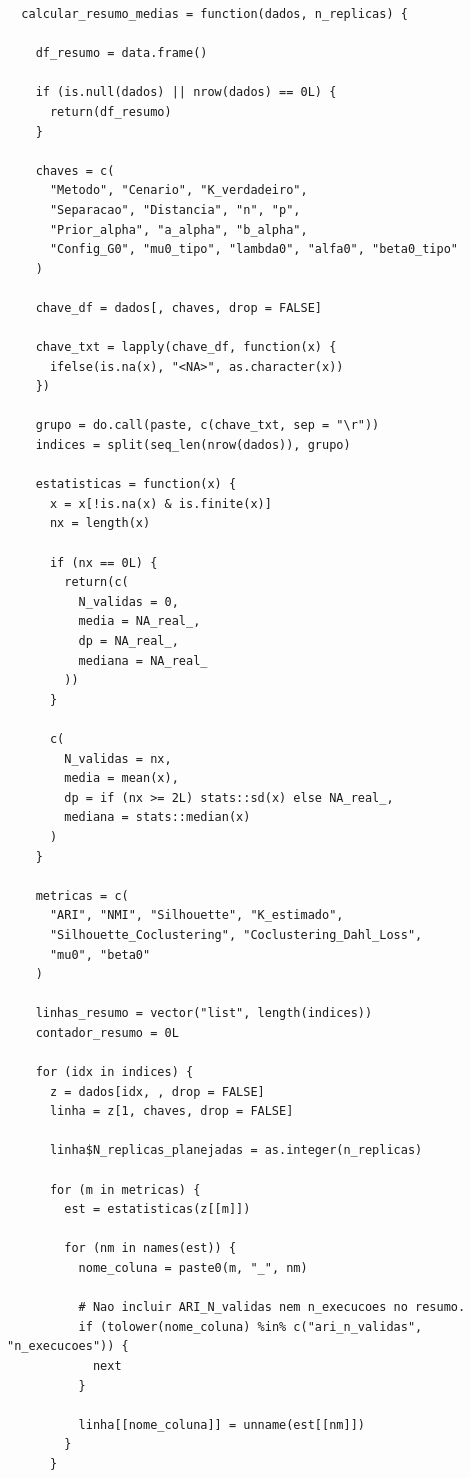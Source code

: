 \begin{verbatim}
  calcular_resumo_medias = function(dados, n_replicas) {
    
    df_resumo = data.frame()
    
    if (is.null(dados) || nrow(dados) == 0L) {
      return(df_resumo)
    }
    
    chaves = c(
      "Metodo", "Cenario", "K_verdadeiro",
      "Separacao", "Distancia", "n", "p",
      "Prior_alpha", "a_alpha", "b_alpha",
      "Config_G0", "mu0_tipo", "lambda0", "alfa0", "beta0_tipo"
    )
    
    chave_df = dados[, chaves, drop = FALSE]
    
    chave_txt = lapply(chave_df, function(x) {
      ifelse(is.na(x), "<NA>", as.character(x))
    })
    
    grupo = do.call(paste, c(chave_txt, sep = "\r"))
    indices = split(seq_len(nrow(dados)), grupo)
    
    estatisticas = function(x) {
      x = x[!is.na(x) & is.finite(x)]
      nx = length(x)
      
      if (nx == 0L) {
        return(c(
          N_validas = 0,
          media = NA_real_,
          dp = NA_real_,
          mediana = NA_real_
        ))
      }
      
      c(
        N_validas = nx,
        media = mean(x),
        dp = if (nx >= 2L) stats::sd(x) else NA_real_,
        mediana = stats::median(x)
      )
    }
    
    metricas = c(
      "ARI", "NMI", "Silhouette", "K_estimado",
      "Silhouette_Coclustering", "Coclustering_Dahl_Loss",
      "mu0", "beta0"
    )
    
    linhas_resumo = vector("list", length(indices))
    contador_resumo = 0L
    
    for (idx in indices) {
      z = dados[idx, , drop = FALSE]
      linha = z[1, chaves, drop = FALSE]
      
      linha$N_replicas_planejadas = as.integer(n_replicas)
      
      for (m in metricas) {
        est = estatisticas(z[[m]])
        
        for (nm in names(est)) {
          nome_coluna = paste0(m, "_", nm)
          
          # Nao incluir ARI_N_validas nem n_execucoes no resumo.
          if (tolower(nome_coluna) %in% c("ari_n_validas", "n_execucoes")) {
            next
          }
          
          linha[[nome_coluna]] = unname(est[[nm]])
        }
      }
      

\end{verbatim}
